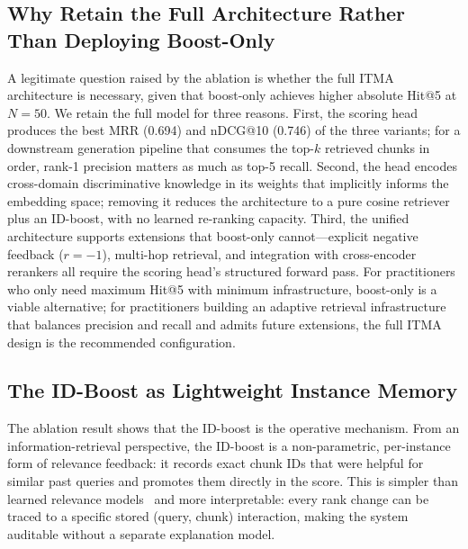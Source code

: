 \documentclass[journal]{IEEEtran}
\begin{document}
\subsection{Why Retain the Full Architecture Rather Than Deploying
Boost-Only}
A legitimate question raised by the ablation is whether the full ITMA
architecture is necessary, given that boost-only achieves higher
absolute Hit@5 at $N{=}50$.  We retain the full model for three
reasons.  First, the scoring head produces the best MRR (0.694) and
nDCG@10 (0.746) of the three variants; for a downstream generation
pipeline that consumes the top-$k$ retrieved chunks in order, rank-1
precision matters as much as top-5 recall.  Second, the head encodes
cross-domain discriminative knowledge in its weights that implicitly
informs the embedding space; removing it reduces the architecture to a
pure cosine retriever plus an ID-boost, with no learned re-ranking
capacity.  Third, the unified architecture supports extensions that
boost-only cannot---explicit negative feedback ($r{=}-1$), multi-hop
retrieval, and integration with cross-encoder rerankers all require
the scoring head's structured forward pass.  For practitioners who
only need maximum Hit@5 with minimum infrastructure, boost-only is a
viable alternative; for practitioners building an adaptive retrieval
infrastructure that balances precision and recall and admits future
extensions, the full ITMA design is the recommended configuration.

\subsection{The ID-Boost as Lightweight Instance Memory}
The ablation result shows that the ID-boost is the operative mechanism.
From an information-retrieval perspective, the ID-boost is a
non-parametric, per-instance form of relevance feedback: it records
exact chunk IDs that were helpful for similar past queries and promotes
them directly in the score.  This is simpler than learned relevance
models~\cite{lavrenko2001relevance} and more interpretable: every rank
change can be traced to a specific stored (query, chunk) interaction,
making the system auditable without a separate explanation model.
\end{document}
